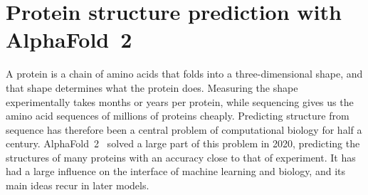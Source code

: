 
\providecommand{\R}{\mathbb{R}}
\providecommand{\E}{\mathbb{E}}
\providecommand{\Normal}{\mathcal{N}}
\providecommand{\argmax}{\operatorname*{arg\,max}}
\providecommand{\argmin}{\operatorname*{arg\,min}}
\providecommand{\vy}{\mathbf{y}}
\providecommand{\vx}{\mathbf{x}}
\providecommand{\mX}{\mathbf{X}}
\providecommand{\mI}{\mathbf{I}}
\providecommand{\vb}{\boldsymbol{\beta}}
\providecommand{\veps}{\boldsymbol{\epsilon}}
\providecommand{\vp}{\mathbf{p}}
\providecommand{\vg}{\mathbf{g}}
\providecommand{\ind}{\mathbf{1}}
\providecommand{\vh}{\mathbf{h}}
\providecommand{\vq}{\mathbf{q}}
\providecommand{\vk}{\mathbf{k}}
\providecommand{\vv}{\mathbf{v}}
\providecommand{\vz}{\mathbf{z}}
\providecommand{\ve}{\mathbf{e}}
\providecommand{\va}{\mathbf{a}}
\providecommand{\vs}{\mathbf{s}}
\providecommand{\mW}{\mathbf{W}}
\providecommand{\mR}{\mathbf{R}}
\providecommand{\softmax}{\operatorname{softmax}}
\providecommand{\vm}{\mathbf{m}}
\providecommand{\vo}{\mathbf{o}}
\providecommand{\vt}{\mathbf{t}}
\providecommand{\vu}{\mathbf{u}}
\providecommand{\vw}{\mathbf{w}}
\providecommand{\vc}{\mathbf{c}}
\providecommand{\vf}{\mathbf{f}}
\providecommand{\mF}{\mathbf{F}}
\providecommand{\mM}{\mathbf{M}}
\providecommand{\mJ}{\mathbf{J}}
\providecommand{\SE}{\mathrm{SE}(3)}
\providecommand{\SO}{\mathrm{SO}(3)}
\providecommand{\LN}{\operatorname{LN}}
\providecommand{\sigm}{\operatorname{sigmoid}}
\providecommand{\Ca}{C$\alpha$}

\providecommand{\chaptertoc}{}
\chapter{Protein structure prediction with AlphaFold~2}
\label{ch:alphafold}
\chaptertoc

A protein is a chain of amino acids that folds into a three-dimensional shape, and that shape determines what the protein does. Measuring the shape experimentally takes months or years per protein, while sequencing gives us the amino acid sequences of millions of proteins cheaply. Predicting structure from sequence has therefore been a central problem of computational biology for half a century. AlphaFold~2~\citep{jumper2021} solved a large part of this problem in 2020, predicting the structures of many proteins with an accuracy close to that of experiment. It has had a large influence on the interface of machine learning and biology, and its main ideas recur in later models.

